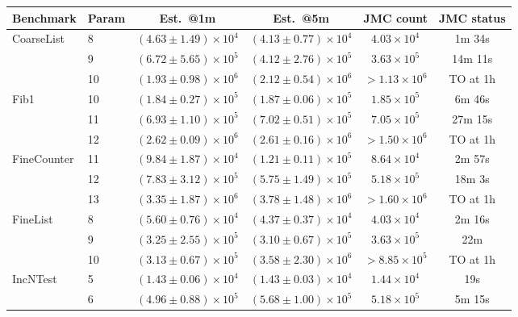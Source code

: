 \documentclass[acmsmall]{acmart}
\newcommand{\jmc}{\textsc{JMC}\xspace}
\begin{document}
\begin{table}[tbp]
\centering
\tiny



\begin{tabular}{llcccc}
\toprule
Benchmark & Param & Est.\ @1m & Est.\ @5m & \jmc count & \jmc status \\
\midrule
\multirow{3}{*}{CoarseList} & 8 & $(4.63 \pm 1.49) \times 10^{4}$ & $(4.13 \pm 0.77) \times 10^{4}$ & $4.03 \times 10^{4}$ & 1m 34s \\
 & 9 & $(6.72 \pm 5.65) \times 10^{5}$ & $(4.12 \pm 2.76) \times 10^{5}$ & $3.63 \times 10^{5}$ & 14m 11s \\
 & 10 & $(1.93 \pm 0.98) \times 10^{6}$ & $(2.12 \pm 0.54) \times 10^{6}$ & $>1.13 \times 10^{6}$ & TO at 1h \\
\midrule
\multirow{3}{*}{Fib1} & 10 & $(1.84 \pm 0.27) \times 10^{5}$ & $(1.87 \pm 0.06) \times 10^{5}$ & $1.85 \times 10^{5}$ & 6m 46s \\
 & 11 & $(6.93 \pm 1.10) \times 10^{5}$ & $(7.02 \pm 0.51) \times 10^{5}$ & $7.05 \times 10^{5}$ & 27m 15s \\
 & 12 & $(2.62 \pm 0.09) \times 10^{6}$ & $(2.61 \pm 0.16) \times 10^{6}$ & $>1.50 \times 10^{6}$ & TO at 1h  \\
\midrule
\multirow{3}{*}{FineCounter} & 11 & $(9.84 \pm 1.87) \times 10^{4}$ & $(1.21 \pm 0.11) \times 10^{5}$ & $8.64 \times 10^{4}$ & 2m 57s \\
 & 12 & $(7.83 \pm 3.12) \times 10^{5}$ & $(5.75 \pm 1.49) \times 10^{5}$ & $5.18 \times 10^{5}$ & 18m 3s \\
 & 13 & $(3.35 \pm 1.87) \times 10^{6}$ & $(3.78 \pm 1.48) \times 10^{6}$ & $>1.60 \times 10^{6}$ & TO at 1h  \\
\midrule
\multirow{3}{*}{FineList} & 8 & $(5.60 \pm 0.76) \times 10^{4}$ & $(4.37 \pm 0.37) \times 10^{4}$ & $4.03 \times 10^{4}$ & 2m 16s \\
 & 9 & $(3.25 \pm 2.55) \times 10^{5}$ & $(3.10 \pm 0.67) \times 10^{5}$ & $3.63 \times 10^{5}$ & 22m \\
 & 10 & $(3.13 \pm 0.67) \times 10^{5}$ & $(3.58 \pm 2.30) \times 10^{6}$ & $>8.85 \times 10^{5}$ & TO at 1h  \\
\midrule
\multirow{3}{*}{IncNTest} & 5 & $(1.43 \pm 0.06) \times 10^{4}$ & $(1.43 \pm 0.03) \times 10^{4}$ & $1.44 \times 10^{4}$ & 19s \\
 & 6 & $(4.96 \pm 0.88) \times 10^{5}$ & $(5.68 \pm 1.00) \times 10^{5}$ & $5.18 \times 10^{5}$ & 5m 15s \\

\end{tabular}
\end{table}
\end{document}
